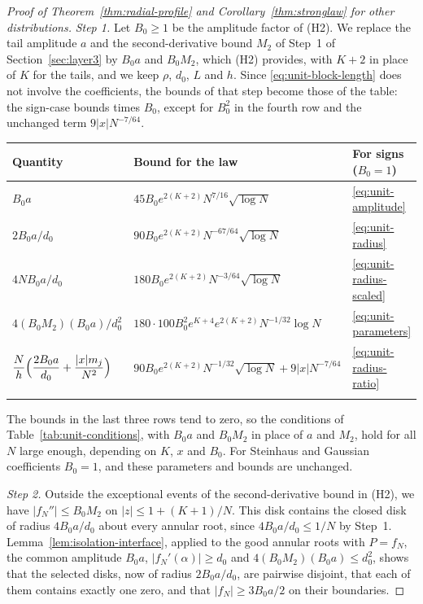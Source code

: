 \begin{proof}[Proof of Theorem~\ref{thm:radial-profile} and Corollary~\ref{thm:stronglaw} for other distributions]
\emph{Step 1.}
Let $B_0\ge1$ be the amplitude factor of (H2).
We replace the tail amplitude $a$ and the second-derivative bound $M_2$
of Step~1 of Section~\ref{sec:layer3} by $B_0a$ and $B_0M_2$, which (H2)
provides, with $K+2$ in place of $K$ for the tails, and we keep $\rho$,
$d_0$, $L$ and $h$.
Since \eqref{eq:unit-block-length} does not involve the coefficients,
the bounds of that step become those of the table: the sign-case bounds
times $B_0$, except for $B_0^2$ in the fourth row and the unchanged term
$9|x|N^{-7/64}$.
\begin{center}
\small
\renewcommand{\arraystretch}{1.3}
\begin{tabular}{@{}lll@{}}
\toprule
Quantity & Bound for the law & For signs ($B_0=1$)\\
\midrule
$B_0a$ & $45B_0e^{2(K+2)}N^{7/16}\sqrt{\log N}$
 & \eqref{eq:unit-amplitude}\\
$2B_0a/d_0$ & $90B_0e^{2(K+2)}N^{-67/64}\sqrt{\log N}$
 & \eqref{eq:unit-radius}\\
$4NB_0a/d_0$ & $180B_0e^{2(K+2)}N^{-3/64}\sqrt{\log N}$
 & \eqref{eq:unit-radius-scaled}\\
$4(B_0M_2)(B_0a)/d_0^2$
 & $180\cdot100B_0^2e^{K+4}e^{2(K+2)}N^{-1/32}\log N$
 & \eqref{eq:unit-parameters}\\
$\dfrac Nh\Bigl(\dfrac{2B_0a}{d_0}+\dfrac{|x|m_j}{N^2}\Bigr)$
 & $90B_0e^{2(K+2)}N^{-1/32}\sqrt{\log N}+9|x|N^{-7/64}$
 & \eqref{eq:unit-radius-ratio}\\
\addlinespace
\bottomrule
\end{tabular}
\end{center}
The bounds in the last three rows tend to zero, so the conditions of
Table~\ref{tab:unit-conditions}, with $B_0a$ and $B_0M_2$ in place of $a$
and $M_2$, hold for all $N$ large enough, depending on $K$, $x$ and
$B_0$.
For Steinhaus and Gaussian coefficients $B_0=1$, and these parameters and
bounds are unchanged.

\emph{Step 2.}
Outside the exceptional events of the second-derivative bound in (H2), we
have $|f_N''|\le B_0M_2$ on $|z|\le1+(K+1)/N$. This disk contains the
closed disk of radius $4B_0a/d_0$ about every annular root, since
$4B_0a/d_0\le1/N$ by Step~1.
Lemma~\ref{lem:isolation-interface}, applied to the good annular roots
with $P=f_N$, the common amplitude $B_0a$, $|f_N'(\alpha)|\ge d_0$ and
$4(B_0M_2)(B_0a)\le d_0^2$, shows that the selected disks, now of
radius $2B_0a/d_0$, are pairwise disjoint, that each of them contains
exactly one zero, and that $|f_N|\ge3B_0a/2$ on their boundaries.


\end{proof}
